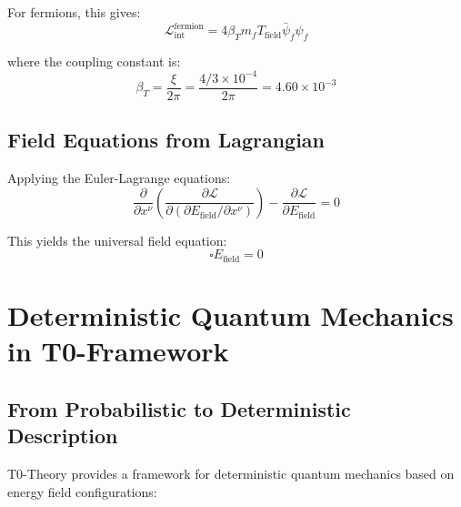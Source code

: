\documentclass[12pt,a4paper]{article}
\theoremstyle{definition}
\begin{document}
For fermions, this gives:
\begin{equation}
	\mathcal{L}_{\text{int}}^{\text{fermion}} = 4\beta_T m_f T_{\text{field}} \bar{\psi}_f \psi_f
\end{equation}

where the coupling constant is:
\begin{equation}
	\beta_T = \frac{\xi}{2\pi} = \frac{4/3 \times 10^{-4}}{2\pi} = 4.60 \times 10^{-3}
\end{equation}

\subsection{Field Equations from Lagrangian}

Applying the Euler-Lagrange equations:
\begin{equation}
	\frac{\partial}{\partial x^\nu}\left(\frac{\partial \mathcal{L}}{\partial(\partial E_{\text{field}}/\partial x^\nu)}\right) - \frac{\partial \mathcal{L}}{\partial E_{\text{field}}} = 0
\end{equation}

This yields the universal field equation:
\begin{equation}
	\boxed{\square E_{\text{field}} = 0}
\end{equation}




\section{Deterministic Quantum Mechanics in T0-Framework}

\subsection{From Probabilistic to Deterministic Description}

T0-Theory provides a framework for deterministic quantum mechanics based on energy field configurations:
\end{document}
